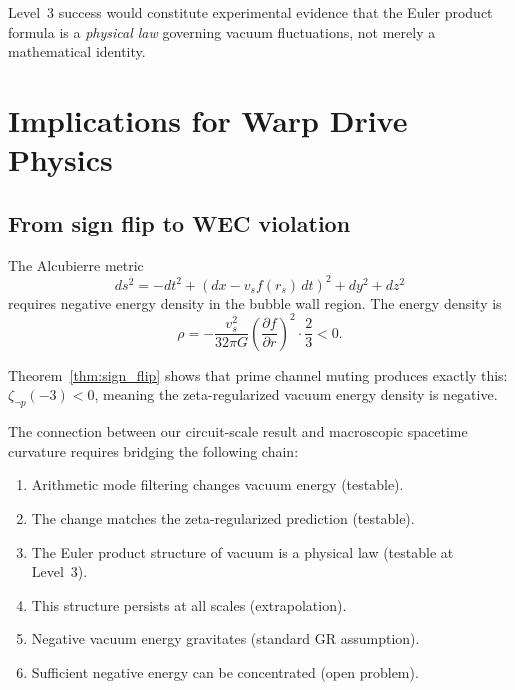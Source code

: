 \documentclass[aps,prd,twocolumn,superscriptaddress,nofootinbib]{revtex4-2}
\begin{document}
Level~3 success would constitute experimental evidence that the
Euler product formula is a \emph{physical law} governing vacuum
fluctuations, not merely a mathematical identity.

\section{Implications for Warp Drive Physics}
\label{sec:warp}

\subsection{From sign flip to WEC violation}

The Alcubierre metric~\cite{Alcubierre1994}
\begin{equation}
  ds^2 = -dt^2 + (dx - v_s f(r_s)\,dt)^2 + dy^2 + dz^2
\end{equation}
requires negative energy density in the bubble wall region.
The energy density is~\cite{PfenningFord1997}
\begin{equation}
  \rho = -\frac{v_s^2}{32\pi G}\left(\frac{\partial f}{\partial r}\right)^2 \cdot \frac{2}{3} < 0.
\end{equation}

Theorem~\ref{thm:sign_flip} shows that prime channel muting
produces exactly this: $\zeta_{\neg p}(-3) < 0$, meaning the
zeta-regularized vacuum energy density is negative.

The connection between our circuit-scale result and macroscopic
spacetime curvature requires bridging the following chain:
\begin{enumerate}
  \item Arithmetic mode filtering changes vacuum energy (testable).
  \item The change matches the zeta-regularized prediction (testable).
  \item The Euler product structure of vacuum is a physical law (testable at Level~3).
  \item This structure persists at all scales (extrapolation).
  \item Negative vacuum energy gravitates (standard GR assumption).
  \item Sufficient negative energy can be concentrated (open problem).
\end{enumerate}
\end{document}
